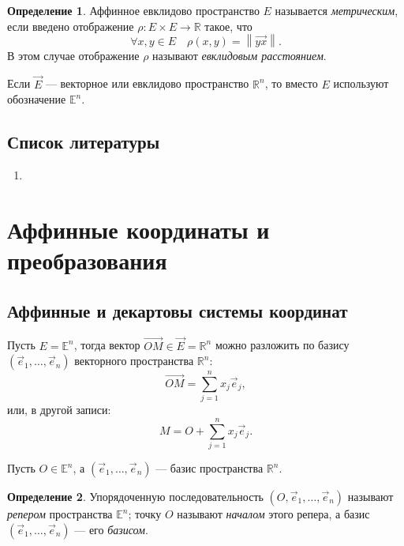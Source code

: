\documentclass{article}
\theoremstyle{definition}
\newtheorem{definition}{Определение}[section]
\theoremstyle{plain}
\theoremstyle{remark}
\numberwithin{equation}{section}
\newcommand{\vv}[1]{\overrightarrow{#1}}
\newcommand{\norm}[1]{\left\lVert#1\right\rVert}
\begin{document}
\begin{definition}
  Аффинное евклидово пространство $E$ называется \textit{метрическим}, если
  введено отображение $\rho : E \times E \to \mathbb{R}$ такое, что
  \begin{equation*}
    \forall x,y \in E \quad \rho(x,y) = \norm{\vv{yx}}.
  \end{equation*}
  В этом случае отображение $\rho$ называют \textit{евклидовым расстоянием}.
\end{definition}

Если $\vec{E}$ --- векторное или евклидово пространство $\mathbb{R}^n$, то
вместо $E$ используют обозначение $\mathbb{E}^n$.

\subsection{Список литературы}
\begin{enumerate}
  \item \cite{lectures}
\end{enumerate}

\pagebreak


\section{Аффинные координаты и преобразования}

\subsection{Аффинные и декартовы системы координат}

Пусть $E = \mathbb{E}^n$, тогда вектор $\vv{OM} \in \vec{E} = \mathbb{R}^n$
можно разложить по базису $(\vec{e}_1, \dots, \vec{e}_n)$ векторного
пространства $\mathbb{R}^n$:
\begin{equation}
  \label{eq:vec_coords}
  \vv{OM} = \sum_{j=1}^n x_j \vec{e}_j,
\end{equation}
или, в другой записи:
\begin{equation}
  \label{eq:vec_coords_alt}
  M = O + \sum_{j=1}^n x_j \vec{e}_j.
\end{equation}

Пусть $O \in \mathbb{E}^n$, а $(\vec{e}_1, \dots, \vec{e}_n)$ --- базис
пространства $\mathbb{R}^n$.
\begin{definition}
  Упорядоченную последовательность $(O, \vec{e}_1, \dots, \vec{e}_n)$ называют
  \textit{репером} пространства $\mathbb{E}^n$; точку $O$ называют
  \textit{началом} этого репера, а базис $(\vec{e}_1, \dots, \vec{e}_n)$ ---
  его \textit{базисом}.
\end{definition}
\end{document}
